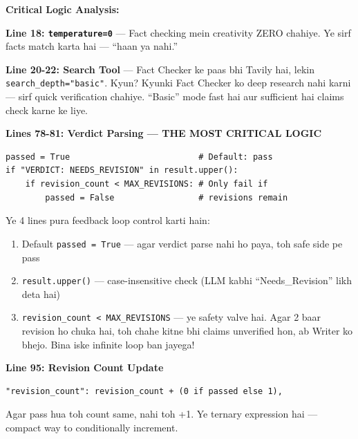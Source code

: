 \documentclass[12pt, a4paper]{article}
\begin{document}
\begin{codestorybox}
\textbf{Critical Logic Analysis:}

\textbf{Line 18: \texttt{temperature=0}} --- Fact checking mein creativity ZERO chahiye. Ye sirf facts match karta hai --- ``haan ya nahi.''

\textbf{Line 20-22: Search Tool} --- Fact Checker ke paas bhi Tavily hai, lekin \texttt{search\_depth="basic"}. Kyun? Kyunki Fact Checker ko deep research nahi karni --- sirf quick verification chahiye. ``Basic'' mode fast hai aur sufficient hai claims check karne ke liye.

\textbf{Lines 78-81: Verdict Parsing --- THE MOST CRITICAL LOGIC}
\begin{lstlisting}[style=pythonstyle]
passed = True                          # Default: pass
if "VERDICT: NEEDS_REVISION" in result.upper():
    if revision_count < MAX_REVISIONS: # Only fail if
        passed = False                 # revisions remain
\end{lstlisting}

Ye 4 lines pura feedback loop control karti hain:
\begin{enumerate}
\item Default \texttt{passed = True} --- agar verdict parse nahi ho paya, toh safe side pe pass
\item \texttt{result.upper()} --- case-insensitive check (LLM kabhi ``Needs\_Revision'' likh deta hai)
\item \texttt{revision\_count < MAX\_REVISIONS} --- ye safety valve hai. Agar 2 baar revision ho chuka hai, toh chahe kitne bhi claims unverified hon, ab Writer ko bhejo. Bina iske infinite loop ban jayega!
\end{enumerate}

\textbf{Line 95: Revision Count Update}
\begin{lstlisting}[style=pythonstyle]
"revision_count": revision_count + (0 if passed else 1),
\end{lstlisting}
Agar pass hua toh count same, nahi toh +1. Ye ternary expression hai --- compact way to conditionally increment.
\end{codestorybox}
\end{document}
